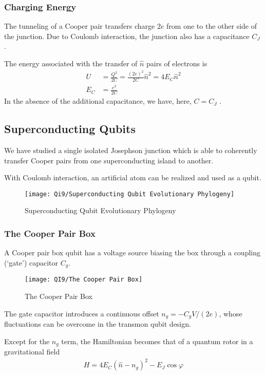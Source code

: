 \subsubsection{Charging Energy}
The tunneling of a Cooper pair transfers charge $2e$ from one to the other side of the junction. Due to Coulomb interaction, the junction also has a capacitance $C_J$ .

The energy associated with the transfer of $\hat{n}$ pairs of electrons is
\begin{align*}
    U&=\frac{Q^2}{2C}=\frac{(2e)^2}{2C}\hat{n}^2=4E_C \hat{n}^2 \\
    E_C&=\frac{e^2}{2C}
\end{align*}
In the absence of the additional capacitance, we have, here, $C = C_J$ .

\subsection{Superconducting Qubits}

We have studied a single isolated Josephson junction which is able to coherently transfer Cooper pairs from one superconducting island to another. 

With Coulomb interaction, an artificial atom can be realized and used as a qubit.

\begin{figure}[H]
    \centering
    \texttt{[image: Qi9/Superconducting Qubit Evolutionary Phylogeny]}
    \caption{Superconducting Qubit Evolutionary Phylogeny}
\end{figure}


\subsubsection{The Cooper Pair Box}
A Cooper pair box qubit has a voltage source biasing the box through a coupling (`gate') capacitor $C_g$. 

\begin{figure}[H]
    \centering
    \texttt{[image: QI9/The Cooper Pair Box]}
    \caption{The Cooper Pair Box}
\end{figure}

The gate capacitor introduces a continuous offset $n_g = -C_g V /(2e)$, whose fluctuations can be overcome in the transmon qubit design.

Except for the $n_g$ term, the Hamiltonian becomes that of a quantum rotor in a gravitational field
\begin{align*}
    H=4E_C (\hat{n}-n_g)^2-E_J\cos\varphi
\end{align*}

